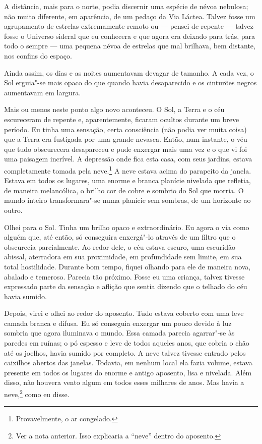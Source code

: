 A distância, mais para o norte, podia discernir uma espécie de névoa nebulosa; não muito diferente, em aparência, de um
pedaço da Via Láctea. Talvez fosse um agrupamento de estrelas extremamente remoto ou --- pensei de repente --- talvez
fosse o Universo sideral que eu conhecera e que agora era deixado para trás, para todo o sempre --- uma pequena névoa de
estrelas que mal brilhava, bem distante, nos confins do espaço.

Ainda assim, os dias e as noites aumentavam devagar de tamanho. A cada vez, o Sol erguia"-se mais opaco do que quando
havia desaparecido e os cinturões negros aumentavam em largura.

Mais ou menos neste ponto algo novo aconteceu. O Sol, a Terra e o céu escureceram de repente e, aparentemente,
ficaram ocultos durante um breve período. Eu tinha uma sensação, certa consciência (não podia ver muita coisa) que a
Terra era fustigada por uma grande nevasca. Então, num instante, o véu que tudo obscurecera desapareceu e pude
enxergar mais uma vez e o que vi foi uma paisagem incrível. A depressão onde fica esta casa, com seus jardins,
estava completamente tomada pela neve.\footnote{ Provavelmente, o ar congelado.} 
A neve estava acima do parapeito da janela. Estava em todos os lugares, uma
enorme e branca planície nivelada que refletia, de maneira melancólica, o brilho cor de cobre e sombrio do Sol que
morria. O mundo inteiro transformara"-se numa planície sem sombras, de um horizonte ao outro.

Olhei para o Sol. Tinha um brilho opaco e extraordinário. Eu agora o via como alguém que, até então, só conseguira
enxergá"-lo através de um filtro que o obscurecia parcialmente. Ao redor dele, o céu estava escuro, uma escuridão
abissal, aterradora em sua proximidade, em profundidade sem limite, em sua total hostilidade. Durante bom tempo,
fiquei olhando para ele de maneira nova, abalado e temeroso. Parecia tão próximo. Fosse eu uma criança, talvez tivesse
expressado parte da sensação e aflição que sentia dizendo que o telhado do céu havia sumido.

Depois, virei e olhei ao redor do aposento. Tudo estava coberto com uma leve camada branca e difusa. Eu
só conseguia enxergar um pouco devido à luz sombria que agora iluminava o mundo. Essa camada parecia agarrar"-se às
paredes em ruínas; o pó espesso e leve de todos aqueles anos, que cobria o chão até os joelhos, havia sumido por
completo. A neve talvez tivesse entrado pelos caixilhos abertos das janelas. Todavia, em nenhum local ela fazia volume,
estava presente em todos os lugares do enorme e antigo aposento, lisa e nivelada. Além disso, não houvera vento algum
em todos esses milhares de anos. Mas havia a neve,\footnote{ Ver a nota
anterior. Isso explicaria a ``neve'' dentro do aposento.} como eu disse.

